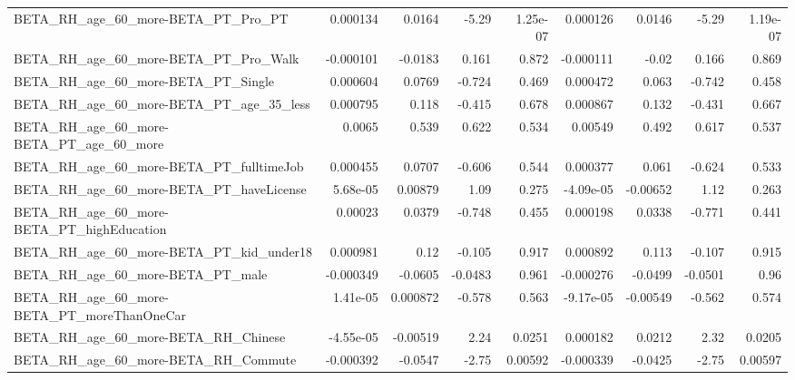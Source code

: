\begin{tabular}{lrrrrrrrr}
BETA\_RH\_age\_60\_more-BETA\_PT\_Pro\_PT                 &    0.000134 &       0.0164 &     -5.29 & 1.25e-07 &   0.000126 &      0.0146 &        -5.29 &      1.19e-07 \\
BETA\_RH\_age\_60\_more-BETA\_PT\_Pro\_Walk               &   -0.000101 &      -0.0183 &     0.161 &    0.872 &  -0.000111 &       -0.02 &        0.166 &         0.869 \\
BETA\_RH\_age\_60\_more-BETA\_PT\_Single                 &    0.000604 &       0.0769 &    -0.724 &    0.469 &   0.000472 &       0.063 &       -0.742 &         0.458 \\
BETA\_RH\_age\_60\_more-BETA\_PT\_age\_35\_less            &    0.000795 &        0.118 &    -0.415 &    0.678 &   0.000867 &       0.132 &       -0.431 &         0.667 \\
BETA\_RH\_age\_60\_more-BETA\_PT\_age\_60\_more            &      0.0065 &        0.539 &     0.622 &    0.534 &    0.00549 &       0.492 &        0.617 &         0.537 \\
BETA\_RH\_age\_60\_more-BETA\_PT\_fulltimeJob            &    0.000455 &       0.0707 &    -0.606 &    0.544 &   0.000377 &       0.061 &       -0.624 &         0.533 \\
BETA\_RH\_age\_60\_more-BETA\_PT\_haveLicense            &    5.68e-05 &      0.00879 &      1.09 &    0.275 &  -4.09e-05 &    -0.00652 &         1.12 &         0.263 \\
BETA\_RH\_age\_60\_more-BETA\_PT\_highEducation          &     0.00023 &       0.0379 &    -0.748 &    0.455 &   0.000198 &      0.0338 &       -0.771 &         0.441 \\
BETA\_RH\_age\_60\_more-BETA\_PT\_kid\_under18            &    0.000981 &         0.12 &    -0.105 &    0.917 &   0.000892 &       0.113 &       -0.107 &         0.915 \\
BETA\_RH\_age\_60\_more-BETA\_PT\_male                   &   -0.000349 &      -0.0605 &   -0.0483 &    0.961 &  -0.000276 &     -0.0499 &      -0.0501 &          0.96 \\
BETA\_RH\_age\_60\_more-BETA\_PT\_moreThanOneCar         &    1.41e-05 &     0.000872 &    -0.578 &    0.563 &  -9.17e-05 &    -0.00549 &       -0.562 &         0.574 \\
BETA\_RH\_age\_60\_more-BETA\_RH\_Chinese                &   -4.55e-05 &     -0.00519 &      2.24 &   0.0251 &   0.000182 &      0.0212 &         2.32 &        0.0205 \\
BETA\_RH\_age\_60\_more-BETA\_RH\_Commute                &   -0.000392 &      -0.0547 &     -2.75 &  0.00592 &  -0.000339 &     -0.0425 &        -2.75 &       0.00597 \\

\end{tabular}
